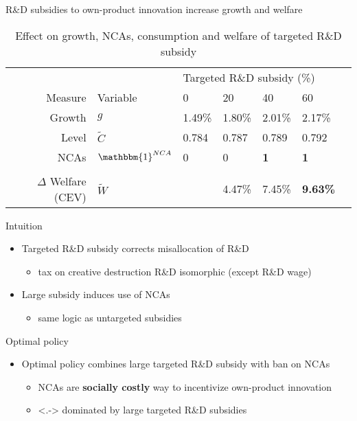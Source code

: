 \documentclass[english,usenames,dvipsnames]{beamer}
\begin{document}
\begin{frame}{R\&D subsidies to own-product innovation increase growth and welfare}\label{OI_RDsubsidy_table}
	\begin{table}
		\centering
		\caption*{Effect on growth, NCAs, consumption and welfare of targeted R\&D subsidy}
		\small
		\begin{tabular}{rllllll}
			\toprule \toprule
			 &  & \multicolumn{4}{l}{Targeted R\&D subsidy (\%)} \vspace{3pt} \tabularnewline
			Measure &Variable & 0 & 20 & 40 & 60 \tabularnewline
			\midrule
			Growth & $g$ & 1.49\% & 1.80\% & 2.01\% & 2.17\% \tabularnewline
			Level & $\tilde{C}$  & 0.784 &  0.787 & 0.789 & 0.792 \tabularnewline 
			NCAs & $\mathbbm{1}^{NCA}$ & 0 & 0 & \alert{\textbf{1}} & \alert{\textbf{1}} \tabularnewline
			\tabularnewline
			$\Delta$ Welfare (CEV) & $\tilde{W}$  &  & 4.47\% & 7.45\% & \alert{\textbf{9.63\%}} \tabularnewline
			\bottomrule
		\end{tabular}
	\end{table}
	\hyperlink{oi_rd_subsidies:decomposition_growth_decrease}{}
	\hyperlink{plots:oi_rd_subsidies1}{} \hyperlink{plots:oi_rd_subsidies2}{}	
\end{frame}

\begin{frame}{Intuition}\label{OI_RDsubsidy_intuition}
	\begin{itemize}
		\item <+-> Targeted R\&D subsidy corrects misallocation of R\&D
		\begin{itemize}
			\item tax on creative destruction R\&D isomorphic (except R\&D wage)
		\end{itemize}
		\smallskip
		\item <+-> Large subsidy induces use of NCAs
		\begin{itemize}
			\item same logic as untargeted subsidies
		\end{itemize}
		\smallskip
	\end{itemize}
\end{frame}

\begin{frame}{Optimal policy}\label{all_policies_overview}
	\begin{itemize}
		\item <+-> Optimal policy combines large targeted R\&D subsidy with ban on NCAs \hyperlink{plots:all_policies}{} 
		\begin{itemize}
			\item<+-> NCAs are \alert{\textbf{socially costly}} way to incentivize own-product innovation
			\item<.-> dominated by large targeted R\&D subsidies 	\hyperlink{intuition:all_policies}{}
		\end{itemize}
	\end{itemize}
\end{frame}
\end{document}
